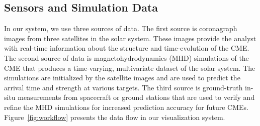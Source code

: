 \documentclass[journal]{vgtc}                %
\begin{document}
\subsection{Sensors and Simulation Data} \label{sec:data}
In our system, we use three sources of data. The first source is coronagraph images from three satellites in the solar system. These images provide the analyst with real-time information about the structure and time-evolution of the CME. The second source of data is magnetohydrodynamics (MHD) simulations of the CME that produces a time-varying, multivariate dataset of the solar system. The simulations are initialized by the satellite images and are used to predict the arrival time and strength at various targets. The third source is ground-truth in-situ measurements from spacecraft or ground stations that are used to verify and refine the MHD simulations for increased prediction accuracy for future CMEs. Figure~\ref{fig:workflow} presents the data flow in our visualization system.
\end{document}
